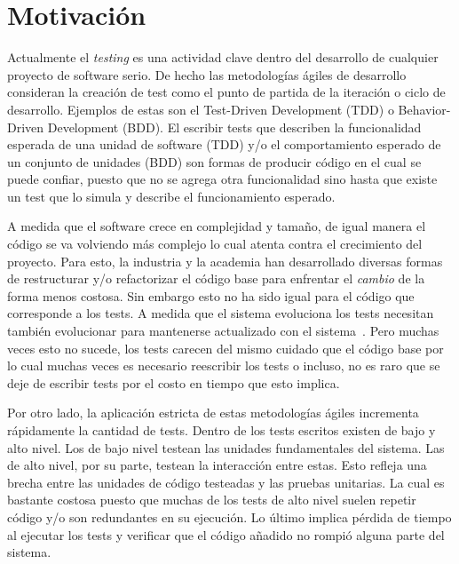 \section{Motivación}
\par Actualmente el \emph{testing} es una actividad clave dentro del desarrollo de cualquier proyecto de software serio. De hecho las metodologías ágiles de desarrollo consideran la creación de test como el punto de partida de la iteración o ciclo de desarrollo. Ejemplos de estas son el Test-Driven Development (TDD) o Behavior-Driven Development (BDD). El escribir tests que describen la funcionalidad esperada de una unidad de software (TDD) y/o el comportamiento esperado de un conjunto de unidades (BDD) son formas de producir código en el cual se puede confiar, puesto que no se agrega otra funcionalidad sino hasta que existe un test que lo simula y describe el funcionamiento esperado.

\par A medida que el software crece en complejidad y tamaño, de igual manera el código se va volviendo más complejo lo cual atenta contra el crecimiento del proyecto. Para esto, la industria y la academia han desarrollado diversas formas de restructurar y/o refactorizar el código base para enfrentar el \emph{cambio} de la forma menos costosa. Sin embargo esto no ha sido igual para el código que corresponde a los tests. A medida que el sistema evoluciona los tests necesitan también evolucionar para mantenerse actualizado con el sistema~\cite{reichhart2007rule}.  Pero muchas veces esto no sucede, los tests carecen del mismo cuidado que el código base por lo cual muchas veces es necesario reescribir los tests o incluso, no es raro que se deje de escribir tests por el costo en tiempo que esto implica.

\par Por otro lado, la aplicación estricta de estas metodologías ágiles incrementa rápidamente la cantidad de tests. Dentro de los tests escritos existen de bajo y alto nivel. Los de bajo nivel testean las unidades fundamentales del sistema. Las de alto nivel, por su parte, testean la interacción entre estas. Esto refleja una brecha entre las unidades de código testeadas y las pruebas unitarias. La cual es bastante costosa puesto que muchas de los tests de alto nivel suelen repetir código y/o son redundantes en su ejecución. Lo último implica pérdida de tiempo al ejecutar los tests y verificar que el código añadido no rompió alguna parte del sistema.


